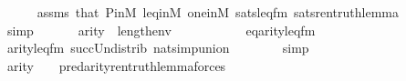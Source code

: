 \begin{isabellebody}
\ \ \ \ \isamarkupfalse%
\ assms\ that\ P{\isacharunderscore}{\kern0pt}in{\isacharunderscore}{\kern0pt}M\ leq{\isacharunderscore}{\kern0pt}in{\isacharunderscore}{\kern0pt}M\ one{\isacharunderscore}{\kern0pt}in{\isacharunderscore}{\kern0pt}M\ sats{\isacharunderscore}{\kern0pt}leq{\isacharunderscore}{\kern0pt}fm\ sats{\isacharunderscore}{\kern0pt}ren{\isacharunderscore}{\kern0pt}truth{\isacharunderscore}{\kern0pt}lemma\isanewline
\ \ \ \ \isamarkupfalse%
\ simp\isanewline
\ \ \isamarkupfalse%
\isanewline
\ \ \isamarkupfalse%
\ {\isachardoublequoteopen}arity{\isacharparenleft}{\kern0pt}{\isacharquery}{\kern0pt}{\isasympsi}{\isacharparenright}{\kern0pt}\ {\isasymle}\ {}{\isacharhash}{\kern0pt}{\isacharplus}{\kern0pt}length{\isacharparenleft}{\kern0pt}env{\isacharparenright}{\kern0pt}{\isachardoublequoteclose}\ \isanewline
\ \ \isamarkupfalse%
\ {\isacharminus}{\kern0pt}\isanewline
\ \ \ \ \isamarkupfalse%
\ eq{\isacharcolon}{\kern0pt}{\isachardoublequoteopen}arity{\isacharparenleft}{\kern0pt}leq{\isacharunderscore}{\kern0pt}fm{\isacharparenleft}{\kern0pt}{}{\isacharcomma}{\kern0pt}\ {}{\isacharcomma}{\kern0pt}\ {}{\isacharparenright}{\kern0pt}{\isacharparenright}{\kern0pt}\ {\isacharequal}{\kern0pt}\ {}{\isachardoublequoteclose}\isanewline
\ \ \ \ \ \ \isamarkupfalse%
\ arity{\isacharunderscore}{\kern0pt}leq{\isacharunderscore}{\kern0pt}fm\ succ{\isacharunderscore}{\kern0pt}Un{\isacharunderscore}{\kern0pt}distrib\ nat{\isacharunderscore}{\kern0pt}simp{\isacharunderscore}{\kern0pt}union\isanewline
\ \ \ \ \ \ \isamarkupfalse%
\ simp\isanewline
\ \ \ \ \isamarkupfalse%
\ {\isacartoucheopen}{\isasymphi}{\isasymin}{\isacharunderscore}{\kern0pt}{\isacartoucheclose}\isanewline
\ \ \ \ \isamarkupfalse%
\ {\isachardoublequoteopen}arity{\isacharparenleft}{\kern0pt}{\isacharquery}{\kern0pt}{\isasympsi}{\isacharparenright}{\kern0pt}\ {\isacharequal}{\kern0pt}\ {}\ {\isasymunion}\ {\isacharparenleft}{\kern0pt}pred{\isacharcircum}{\kern0pt}{}{\isacharparenleft}{\kern0pt}arity{\isacharparenleft}{\kern0pt}ren{\isacharunderscore}{\kern0pt}truth{\isacharunderscore}{\kern0pt}lemma{\isacharparenleft}{\kern0pt}forces{\isacharparenleft}{\kern0pt}{\isasymphi}{\isacharparenright}{\kern0pt}{\isacharparenright}{\kern0pt}{\isacharparenright}{\kern0pt}{\isacharparenright}{\kern0pt}{\isacharparenright}{\kern0pt}{\isachardoublequoteclose}\isanewline

\end{isabellebody}
